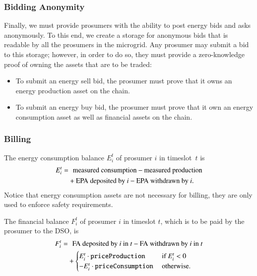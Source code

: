 \subsubsection{Bidding Anonymity}
Finally, we must provide prosumers with the ability to post energy bids and asks anonymously.
To this end, we create a storage for anonymous bids that is readable by all the prosumers in the microgrid.
Any prosumer may submit a bid to this storage; however, in order to do so, they must provide a zero-knowledge proof of owning the assets that are to be traded:
\begin{itemize}
\item To submit an energy sell bid, the prosumer must prove that it owns an energy production asset on the chain.
\item To submit an energy buy bid, the prosumer must prove that it own an energy consumption asset as well as financial assets on the chain.
\end{itemize}

\subsubsection{Billing}

The energy consumption balance $E_i^t$ of prosumer $i$ in timeslot~$t$ is
\begin{align*}
E_i^t = & \hphantom{+} \text{measured consumption} - \text{measured production} \\
 & + \text{EPA deposited by $i$} - \text{EPA withdrawn by $i$} .
\end{align*}
Notice that energy consumption assets are not necessary for billing, they are only used to enforce safety requirements.

The financial balance $F_i^t$ of prosumer $i$ in timeslot $t$, which is to be paid by the prosumer to the DSO, is
\begin{align*}
F_i^t = & \hphantom{+} \text{FA deposited by $i$ in $t$} - \text{FA withdrawn by $i$ in $t$} \\
 & + \begin{cases}
E_i^t \cdot \texttt{priceProduction} & \text{ if } E_i^t < 0 \\
- E_i^t \cdot \texttt{priceConsumption} & \text{ otherwise.} 
\end{cases}
\end{align*}


